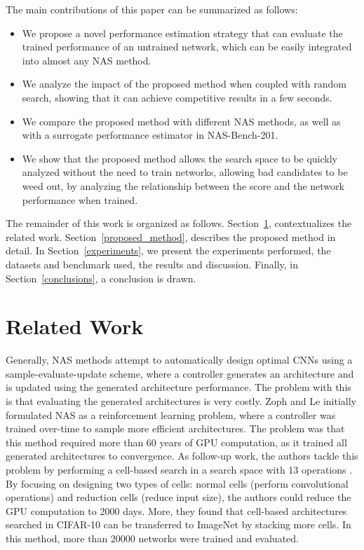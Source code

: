 \documentclass[10pt, conference]{IEEEtran}
\begin{document}
The main contributions of this paper can be summarized as follows:
\begin{itemize}
    \item We propose a novel performance estimation strategy that can evaluate the trained performance of an  untrained network, which can be easily integrated into almost any NAS method.
    \item We analyze the impact of the proposed method when coupled with random search, showing that it can achieve competitive results in a few seconds.
    \item We compare the proposed method with different NAS methods, as well as with a surrogate performance estimator in NAS-Bench-201.
    \item We show that the proposed method allows the search space to be quickly analyzed without the need to train networks, allowing bad candidates to be weed out, by analyzing the relationship between the score and the network performance when trained.
\end{itemize}

The remainder of this work is organized as follows. Section~\ref{related_work}, contextualizes the related work. Section~\ref{proposed_method}, describes the proposed method in detail. In Section~\ref{experiments}, we present the experiments performed, the datasets and benchmark used, the results and discussion. Finally, in Section~\ref{conclusions}, a conclusion is drawn.









\section{Related Work}
\label{related_work}
Generally, NAS methods attempt to automatically design optimal CNNs using a sample-evaluate-update scheme, where a controller generates an architecture and is updated using the generated architecture performance. The problem with this is that evaluating the generated architectures is very costly. Zoph and Le \cite{DBLP:conf/iclr/ZophL17} initially formulated NAS as a reinforcement learning problem, where a controller was trained over-time to sample more efficient architectures. The problem was that this method required more than 60 years of GPU computation, as it trained all generated architectures to convergence. As follow-up work, the authors tackle this problem by performing a cell-based search in a search space with 13 operations \cite{Zoph_2018}. By focusing on designing two types of cells: normal cells (perform convolutional operations) and reduction cells (reduce input size), the authors could reduce the GPU computation to 2000 days. More, they found that cell-based architectures searched in CIFAR-10 can be transferred to ImageNet by stacking more cells. In this method, more than 20000 networks were trained and evaluated.
\end{document}
